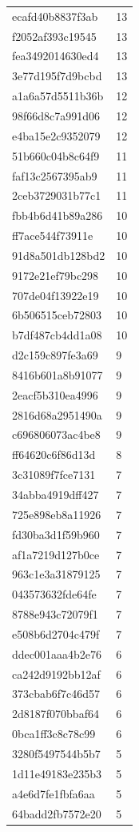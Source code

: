 \begin{tabular}{ll}
ecafd40b8837f3ab & 13 \\
f2052af393c19545 & 13 \\
fea3492014630ed4 & 13 \\
3e77d195f7d9bcbd & 13 \\
a1a6a57d5511b36b & 12 \\
98f66d8c7a991d06 & 12 \\
e4ba15e2c9352079 & 12 \\
51b660c04b8c64f9 & 11 \\
faf13c2567395ab9 & 11 \\
2ceb3729031b77c1 & 11 \\
fbb4b6d41b89a286 & 10 \\
ff7ace544f73911e & 10 \\
91d8a501db128bd2 & 10 \\
9172e21ef79bc298 & 10 \\
707de04f13922e19 & 10 \\
6b506515ceb72803 & 10 \\
b7df487cb4dd1a08 & 10 \\
d2c159c897fe3a69 & 9 \\
8416b601a8b91077 & 9 \\
2eacf5b310ea4996 & 9 \\
2816d68a2951490a & 9 \\
c696806073ac4be8 & 9 \\
ff64620c6f86d13d & 8 \\
3c31089f7fce7131 & 7 \\
34abba4919dff427 & 7 \\
725e898eb8a11926 & 7 \\
fd30ba3d1f59b960 & 7 \\
af1a7219d127b0ce & 7 \\
963c1e3a31879125 & 7 \\
043573632fde64fe & 7 \\
8788e943c72079f1 & 7 \\
e508b6d2704c479f & 7 \\
ddec001aaa4b2e76 & 6 \\
ca242d9192bb12af & 6 \\
373cbab6f7c46d57 & 6 \\
2d8187f070bbaf64 & 6 \\
0bca1ff3c8c78c99 & 6 \\
3280f5497544b5b7 & 5 \\
1d11e49183e235b3 & 5 \\
a4e6d7fe1fbfa6aa & 5 \\
64badd2fb7572e20 & 5 \\

\end{tabular}
